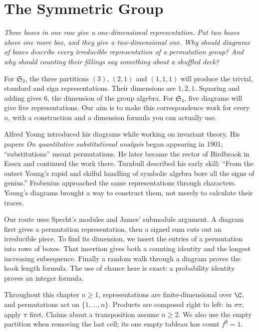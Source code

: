\chapter{The Symmetric Group}

\begin{center}\itshape
Three boxes in one row give a one-dimensional representation. Put two boxes above one more box, and they give a two-dimensional one. Why should diagrams of boxes describe every irreducible representation of a permutation group? And why should counting their fillings say something about a shuffled deck?
\end{center}

For $\mathfrak S_3$, the three partitions $(3)$, $(2,1)$ and $(1,1,1)$ will produce the trivial, standard and sign representations. Their dimensions are $1,2,1$. Squaring and adding gives $6$, the dimension of the group algebra. For $\mathfrak S_4$, five diagrams will give five representations. Our aim is to make this correspondence work for every $n$, with a construction and a dimension formula you can actually use.

Alfred Young introduced his diagrams while working on invariant theory. His papers \emph{On quantitative substitutional analysis} began appearing in 1901; ``substitutions'' meant permutations. He later became the rector of Birdbrook in Essex and continued the work there. Turnbull described his early skill: ``From the outset Young's rapid and skilful handling of symbolic algebra bore all the signs of genius.'' Frobenius approached the same representations through characters. Young's diagrams brought a way to construct them, not merely to calculate their traces.

Our route uses Specht's modules and James' submodule argument. A diagram first gives a permutation representation, then a signed sum cuts out an irreducible piece. To find its dimension, we insert the entries of a permutation into rows of boxes. That insertion gives both a counting identity and the longest increasing subsequence. Finally a random walk through a diagram proves the hook length formula. The use of chance here is exact: a probability identity proves an integer formula.

Throughout this chapter $n\ge1$, representations are finite-dimensional over $\C$, and permutations act on $\{1,\ldots,n\}$. Products are composed right to left: in $\sigma\pi$, apply $\pi$ first. Claims about a transposition assume $n\ge2$. We also use the empty partition when removing the last cell; its one empty tableau has count $f^\emptyset=1$.

